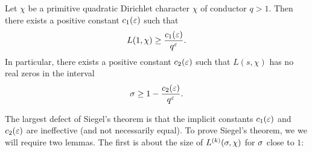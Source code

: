     \begin{theorem}
      Let $\chi$ be a primitive quadratic Dirichlet character $\chi$ of conductor $q > 1$. Then there exists a positive constant $c_{1}(\varepsilon)$ such that
      \[
        L(1,\chi) \ge \frac{c_{1}(\varepsilon)}{q^{\varepsilon}}.
      \]
      In particular, there exists a positive constant $c_{2}(\varepsilon)$ such that $L(s,\chi)$ has no real zeros in the interval
      \[
        \sigma \ge 1-\frac{c_{2}(\varepsilon)}{q^{\varepsilon}}.
      \]
    \end{theorem}

    The largest defect of Siegel's theorem is that the implicit constants $c_{1}(\varepsilon)$ and $c_{2}(\varepsilon)$ are ineffective (and not necessarily equal). To prove Siegel's theorem, we we will require two lemmas. The first is about the size of $L^{(k)}(\sigma,\chi)$ for $\sigma$ close to $1$:

